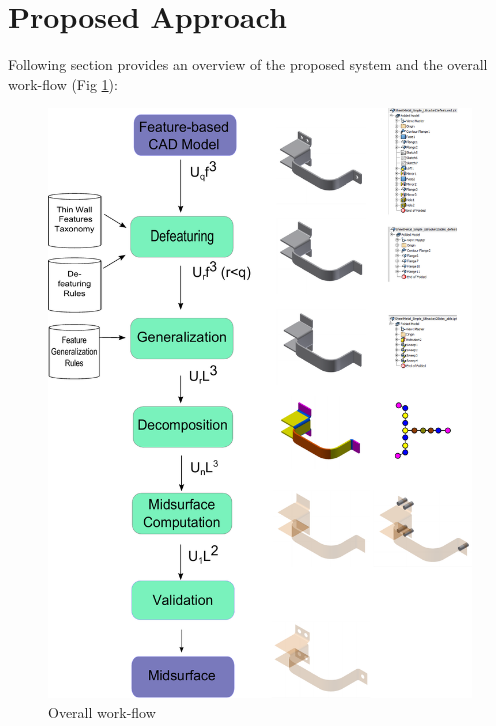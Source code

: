 \newcommand{\loft}[5]{\ensuremath{\textcolor{magenta}{\Omega{\bf \mathcal{L}}_{#1}^{#2,#3}}[\textcolor{blue}{\{#4\}}\textcolor{red}{(#5)}]}}

\newcommand{\affine}[5]{\ensuremath{\textcolor{magenta}{\Delta{\bf \mathcal{A}}_{#1}^{#2,#3}} [\textcolor{blue}{\{#4\}} \textcolor{red}{(#5)}]}}

\newcommand{\boolop}[5]{\ensuremath{\textcolor{magenta}{\Omega{\bf \mathcal{B}}_{#1}^{#2,#3}}[\textcolor{blue}{\{#4\}} \textcolor{red}{(#5)}]}}

\newcommand{\generic}[7]{\ensuremath{\textcolor{magenta}{#1{\bf \mathcal{#2}}_{#3}^{#4,#5}}[\textcolor{blue}{\{#6\}} \textcolor{red}{(#7)}]}}
\newtheorem{mydef}{Definition}
\newtheorem{mylem}{Remark}

\section{Proposed Approach}
\label{sec:approach}
Following section provides an overview of the proposed system and the overall work-flow (Fig  \ref{fig_sysarch}):

    \begin{figure}[!htp]
	\centering 
	\includegraphics[width=0.65\linewidth]{../Common/images/SystemArchitecture3.pdf}
	\caption{Overall work-flow}
	\label{fig_sysarch}
    \end{figure}

